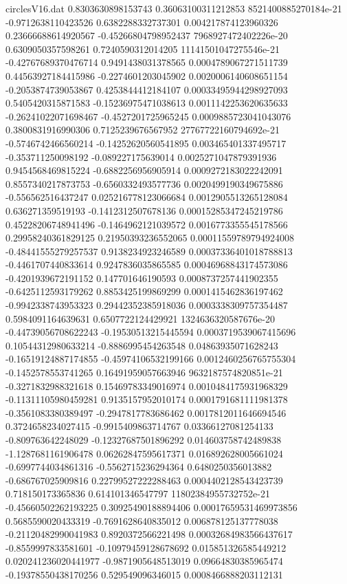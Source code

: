 \begin{filecontents}{circlesV16.dat}
0.8303630898153743	0.36063100311212853	8521400885270184e-21
-0.9712638110423526	0.6382288332737301	0.004217874123960326
0.23666688614920567	-0.45266804798952437	7968927472402226e-20
0.6309050357598261	0.7240590312014205	11141501047275546e-21
-0.42767689370476714	0.9491438031378565	0.0004789067271511739
0.44563927184415986	-0.2274601203045902	0.0020006140608651154
-0.2053874739053867	0.4253844412184107	0.00033495944298927093
0.5405420315871583	-0.15236975471038613	0.0011142253620635633
-0.26241022071698467	-0.4527201725965245	0.0009885723041043076
0.3800831916990306	0.7125239676567952	27767722160794692e-21
-0.5746742466560214	-0.14252620560541895	0.003465401337495717
-0.353711250098192	-0.089227175639014	0.0025271047879391936
0.9454568469815224	-0.6882256956905914	0.0009272183022242091
0.8557340217873753	-0.6560332493577736	0.0020499190349675886
-0.556562516437247	0.025216778123066684	0.0012905513265128084
0.636271359519193	-0.1412312507678136	0.00015285347245219786
0.45228206748941496	-0.1464962121039572	0.0016773355545178566
0.29958240361829125	0.21950393236552065	0.00011559789794924008
-0.48441555279257537	0.9138234923246589	0.00037336401018788813
-0.4461707440833614	0.9247836035865585	0.00046968843174573086
-0.4201939672191152	0.147701646190593	0.0008737257441902355
-0.6425112593179262	0.8853425199869299	0.0001415462836197462
-0.9942338743953323	0.29442352385918036	0.0003338309757354487
0.5984091164639631	0.6507722124429921	1324636320587676e-20
-0.44739056708622243	-0.19530513215445594	0.0003719539067415696
0.10544312980633214	-0.8886995454263548	0.04863935071628243
-0.16519124887174855	-0.45974106532199166	0.0012460256765755304
-0.1452578553741265	0.16491959057663946	9632187574820851e-21
-0.3271832988321618	0.15469783349016974	0.0010484175931968329
-0.11311105980459281	0.9135157952010174	0.0001791681111981378
-0.3561083380389497	-0.2947817783686462	0.0017812011646694546
0.3724658234027415	-0.9915409863714767	0.03366127081254133
-0.809763642248029	-0.12327687501896292	0.014603758742489838
-1.1287681161906478	0.06262847595617371	0.016892628005661024
-0.6997744034861316	-0.5562715236294364	0.6480250356013882
-0.686767025909816	0.22799527222288463	0.0004402128543423739
0.718150173365836	0.614101346547797	11802384955732752e-21
-0.45660502262193225	0.30925490188894406	0.00017659531469973856
0.5685590020433319	-0.7691628640835012	0.006878125137778038
-0.21120482990041983	0.8920372566221498	0.00032684983566437617
-0.8559997833581601	-0.10979459128678692	0.015851326585449212
0.020241236020441977	-0.9871905648513019	0.09664830385965474
-0.19378550438170256	0.529549096346015	0.0008466888203112131

\end{filecontents}
